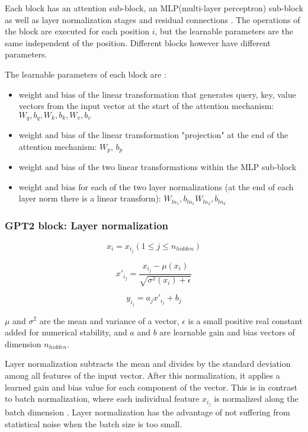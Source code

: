 Each block has an attention sub-block, an MLP(multi-layer perceptron) sub-block as well as layer normalization stages and residual connections  .
The operations of the block are executed for each position $i$, but the learnable parameters are the same independent of the position. Different blocks however have different parameters.

The learnable parameters of each block are \cite{alammar-gpt2}:

\begin{itemize}
\item weight and bias of the linear transformation that generates query, key, value vectors from the input vector
   at the start of the attention mechanism: $W_q, b_q, W_k, b_k, W_v, b_v$
 \item weight and bias of the linear transformation "projection" at the end of the attention mechanism: $W_p$, $b_p$
 \item weight and bias of the two linear transformations within the MLP sub-block
 \item weight and bias for each of the two layer normalizations (at the end of each layer norm there is a linear transform): $W_{ln_1}, b_{ln_1} W_{ln_2}, b_{ln_2}$
\end{itemize}

\subsubsection{GPT2 block: Layer normalization}


$$x_i = x_{i_j} (1 \leq j \leq n_{hidden})$$

$$x'_{i_j} = \frac {x_{i_j} - \mu(x_i)} {\sqrt {\sigma^2(x_i)+\epsilon}} $$

$$y_{i_j} = a_j x'_{i_j} + b_j$$

$\mu$ and $\sigma^2$ are the mean and variance of a vector, $\epsilon$ is a small positive real constant added for numerical stability, and $a$ and $b$ are learnable gain and bias vectors of dimension $n_{hidden}$.

Layer normalization subtracts the mean and divides by the standard deviation among all features of the input vector.
After this normalization, it applies a learned gain and bias value for each component of the vector.
This is in contrast to batch normalization, where each individual feature $x_{i_j}$ is normalized along the batch dimension .
Layer normalization has the advantage of not suffering from statistical noise when the batch size is too small.


